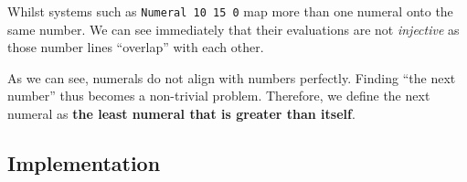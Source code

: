 \documentclass[\main/thesis.tex]{subfiles}
\begin{document}
\begin{center}
    \begin{adjustbox}{max width=\textwidth}
    \end{adjustbox}
\end{center}

Whilst systems such as {\lstinline|Numeral 10 15 0|} map more than one numeral
onto the same number. We can see immediately that their evaluations are not
\textit{injective} as those number lines ``overlap'' with each other.

\begin{center}
    \begin{adjustbox}{max width=\textwidth}
    \end{adjustbox}
\end{center}

As we can see, numerals do not align with numbers perfectly.
Finding ``the next number'' thus becomes a non-trivial problem.
Therefore, we define the next numeral as \textbf{the least numeral that is greater than itself}.

\subsection{Implementation}
\end{document}
